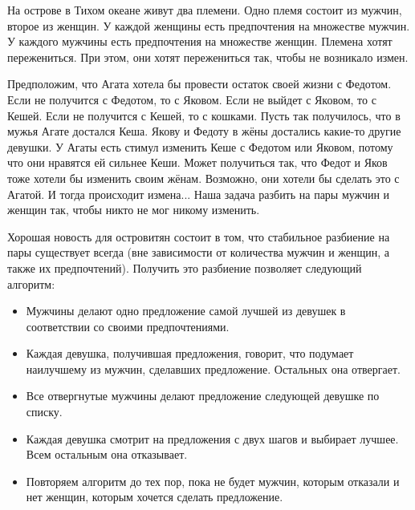 \documentclass[pdftex, 12pt, a4paper]{article}
\begin{document}

На острове в Тихом океане живут два племени. Одно племя состоит из мужчин, второе из женщин. У каждой женщины есть предпочтения на множестве мужчин. У каждого мужчины есть предпочтения на множестве женщин. Племена хотят пережениться. При этом, они хотят пережениться так, чтобы не возникало измен. 

Предположим, что Агата хотела бы провести остаток своей жизни с Федотом. Если не получится с Федотом, то с Яковом. Если не выйдет с Яковом, то с Кешей. Если не получится с Кешей, то с кошками. Пусть так получилось, что в мужья Агате достался Кеша. Якову и Федоту в жёны достались какие-то другие девушки. У Агаты есть стимул изменить Кеше с Федотом или Яковом, потому что они нравятся ей сильнее Кеши. Может получиться так, что Федот и Яков тоже хотели бы изменить своим жёнам. Возможно, они хотели бы сделать это с Агатой. И тогда происходит измена... Наша задача разбить на пары мужчин и женщин так, чтобы никто не мог никому изменить. 


Хорошая новость для островитян состоит в том, что стабильное разбиение на пары существует всегда (вне зависимости от количества мужчин и женщин, а также их предпочтений). Получить это разбиение позволяет следующий алгоритм: 


\begin{itemize} 
\item Мужчины делают одно предложение самой лучшей из девушек в соответствии со своими предпочтениями. 

\item Каждая девушка, получившая предложения, говорит, что подумает наилучшему из мужчин, сделавших предложение. Остальных она отвергает.

\item Все отвергнутые мужчины делают предложение следующей девушке по списку. 

\item Каждая девушка смотрит на предложения с двух шагов и выбирает лучшее. Всем остальным она отказывает.

\item Повторяем алгоритм до тех пор, пока не будет мужчин, которым отказали и нет женщин, которым хочется сделать предложение.  
\end{itemize} 
\end{document}
